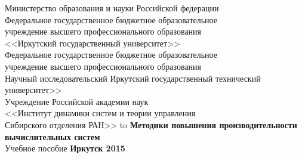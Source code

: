 \documentclass[14pt, a4paper, openany, twoside, final]{extbook} %
\begin{document}

\renewcommand{\chaptername}{} %
\renewcommand{\refname}{Рекомендуемая литература} %
\renewcommand{\bibname}{\refname}
\begin{titlepage}
\thispagestyle{empty}
\begin{center}{\small{}
Министерство образования и науки
Российской федерации \\
Федеральное государственное бюджетное образовательное\\
учреждение высшего профессионального образования\\
<<Иркутский государственный университет>>\\[2ex]
Федеральное государственное бюджетное образовательное\\
учреждение высшего профессионального образования\\
Научный исследовательский Иркутский государственный технический университет>>\\[2ex]
    Учреждение Российской академии наук \\
<<Институт динамики систем и теории управления \\
Сибирского отделения РАН>>
}
\vfill
\hbox to \linewidth{\hfill\bfseries Е.~А.~Черкашин, В.~О.~Обризан\hfill}
 \vspace{2em}
{\large\bfseries Методики повышения производительности вычислительных систем}\\
 \vspace{2em}
{Учебное пособие}
\vfill
\vfill
 \textbf{Иркутск 2015}
\end{center}
\end{titlepage}
\end{document}
